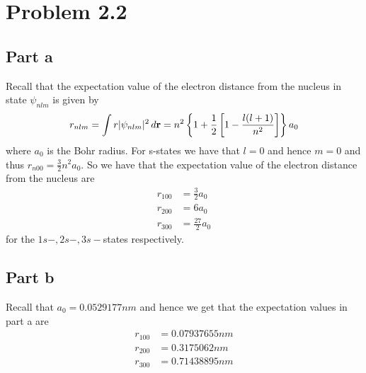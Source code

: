 \documentclass[12pt]{report}
\begin{document}
\section*{Problem 2.2}
\subsection*{Part a}
Recall that the expectation value of the electron distance from the nucleus in state $\psi_{nlm}$ is given by
\begin{equation*}
  r_{nlm} = \int r |\psi_{nlm}|^2 \, d\bold{r} = n^2 \left\{ 1 + \frac{1}{2} \left[1 - \frac{l(l+1)}{n^2}\right]\right\} a_0
\end{equation*}
where $a_0$ is the Bohr radius. For s-states we have that $l = 0$ and hence $m=0$ and thus $r_{n00} = \frac{3}{2}n^2 a_0$. So we have that the expectation value of the electron distance from the nucleus are
\begin{align*}
  r_{100} &= \frac{3}{2} a_0 \\
  r_{200} &= 6 a_0 \\
  r_{300} &= \frac{27}{2} a_0
\end{align*}
for the $1s-,2s-,3s-$states respectively.

\subsection*{Part b}
Recall that $a_0 = 0.0529177 \si{nm}$ and hence we get that the expectation values in part a are
\begin{align*}
  r_{100} &= 0.07937655 \si{nm} \\
  r_{200} &= 0.3175062 \si{nm} \\
  r_{300} &= 0.71438895\si{nm}
\end{align*}
\end{document}
